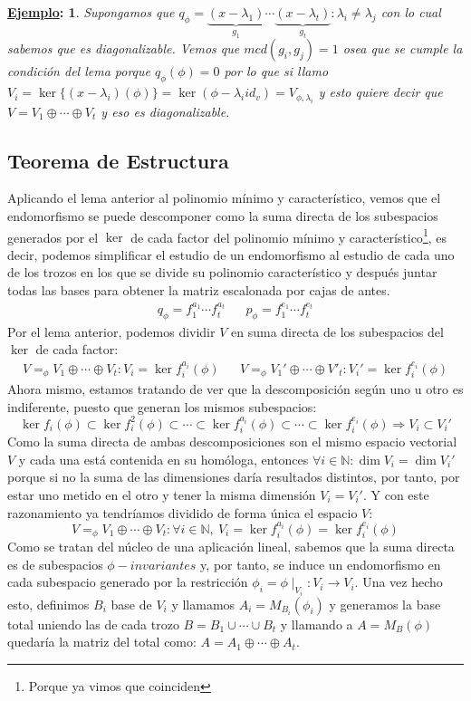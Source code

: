 \documentclass[10pt,a4paper,openright]{book}
\theoremstyle{break}
\newtheorem*{ej}{\underline{Ejemplo}:}
\begin{document}
\begin{ej}
Supongamos que $q_\phi =\underbrace{(x-\lambda_1)}_{g_1}\cdots \underbrace{(x-\lambda_t)}_{g_t} : \lambda_i \neq \lambda_j$ con lo cual sabemos que es diagonalizable. Vemos que $mcd(g_i, g_j)=1$ osea que se cumple la condición del lema porque $q_\phi(\phi)=0$ por lo que si llamo $V_i=\ker\{(x-\lambda_i)(\phi)\}=\ker(\phi-\lambda_i id_v)=V_{\phi, \lambda_i}$ y esto quiere decir que $V= V_1\oplus \cdots \oplus V_t$ y eso es diagonalizable.
\end{ej}

\subsection{Teorema de Estructura}
Aplicando el lema anterior al polinomio mínimo y característico, vemos que el endomorfismo se puede descomponer como la suma directa de los subespacios generados por el $\ker$ de cada factor del polinomio mínimo y característico\footnote{Porque ya vimos que coinciden}, es decir, podemos simplificar el estudio de un endomorfismo al estudio de cada uno de los trozos en los que se divide su polinomio característico y después juntar todas las bases para obtener la matriz escalonada por cajas de antes.
\begin{align*}
q_\phi = f_1^{a_1}\cdots f_t^{a_t} & & p_\phi = f_1^{e_1}\cdots f_t^{e_t}
\end{align*}
Por el lema anterior, podemos dividir $V$ en suma directa de los subespacios del $\ker$ de cada factor:
\begin{align*}
V=_\phi V_1\oplus \cdots \oplus V_t: V_i=\ker f_i^{a_i}(\phi) & & V=_\phi V_1'\oplus \cdots \oplus V'_t: V_i'=\ker f_i^{e_i}(\phi)
\end{align*}
Ahora mismo, estamos tratando de ver que la descomposición según uno u otro es indiferente, puesto que generan los mismos subespacios:
$$\ker f_i(\phi)\subset \ker f_i^2(\phi)\subset \cdots \subset \ker f_i^{a_i}(\phi)\subset \cdots \subset \ker f_i^{e_i}(\phi)\Rightarrow V_i\subset V_i'$$
Como la suma directa de ambas descomposiciones son el mismo espacio vectorial $V$ y cada una está contenida en su homóloga, entonces $\forall i\in \mathbb{N}: \dim V_i = \dim V_i'$ porque si no la suma de las dimensiones daría resultados distintos, por tanto, por estar uno metido en el otro y tener la misma dimensión $V_i=V_i'$. Y con este razonamiento ya tendríamos dividido de forma única el espacio $V$:
$$V=_\phi V_1\oplus \cdots \oplus V_t: \forall i \in \mathbb{N}, \ V_i=\ker f_i^{a_i}(\phi)=\ker f_i^{e_i}(\phi)$$
Como se tratan del núcleo de una aplicación lineal, sabemos que la suma directa es de subespacios $\phi-invariantes$ y, por tanto, se induce un endomorfismo en cada subespacio generado por la restricción $\phi_i=\phi\mid_{V_i}: V_i\rightarrow V_i$. Una vez hecho esto, definimos $B_i$ base de $V_i$ y llamamos $A_i=M_{B_i}(\phi_i)$ y generamos la base total uniendo las de cada trozo $B=B_1\cup \cdots \cup B_t$ y llamando a $A=M_B(\phi)$ quedaría la matriz del total como: $A=A_1\oplus \cdots \oplus A_t$.
\end{document}
